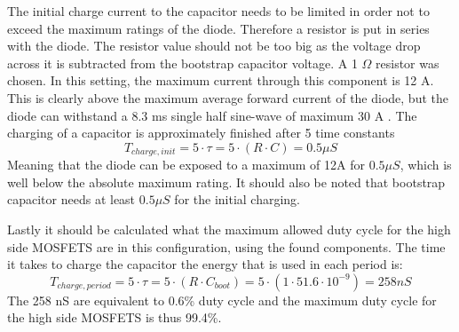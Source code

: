 The initial charge current to the capacitor needs to be limited in order not to exceed the maximum ratings of the diode.
Therefore a resistor is put in series with the diode.
The resistor value should not be too big as the voltage drop across it is subtracted from the bootstrap capacitor voltage.
A 1 $\Omega$ resistor was chosen. In this setting, the maximum current through this component is 12 A.
This is clearly above the maximum average forward current of the diode, but the diode can withstand a 8.3 ms single half sine-wave of maximum 30 A \cite{diode_ds}.
The charging of a capacitor is approximately finished after 5 time constants
\begin{equation}
T_{charge,init} = 5\cdot \tau = 5\cdot (R \cdot C) = 0.5 \mu S 
\end{equation}
Meaning that the diode can be exposed to a maximum of 12A for $0.5 \mu S $, which is well below the absolute maximum rating.
It should also be noted that bootstrap capacitor needs at least $0.5 \mu S $ for the initial charging.


Lastly it should be calculated what the maximum allowed duty cycle for the high side MOSFETS are in this configuration, using the found components.
The time it takes to charge the capacitor the energy that is used in each period is:
\begin{equation}
	T_{charge,period} = 5\cdot \tau = 5\cdot (R \cdot C_{boot}) = 5\cdot (1 \cdot  51.6 \cdot 10^{-9}) = 258 nS 
\end{equation}
The 258 nS are equivalent to 0.6\% duty cycle and the maximum duty cycle for the high side MOSFETS is thus 99.4\%.

